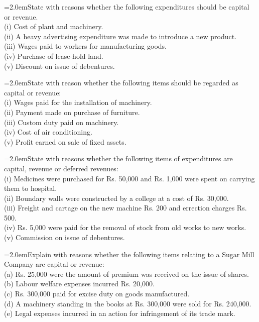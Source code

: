 \documentclass[11pt,a4paper]{article}
\newcommand{\lqn}[2]{\Needspace{6\baselineskip}\par\medskip\noindent\hangindent=2.0em\hangafter=1\makebox[2.0em][l]{\textbf{#1.}}#2\par}
\begin{document}
\lqn{126}{State with reasons whether the following expenditures should be capital or revenue.\\
(i) Cost of plant and machinery.\\
(ii) A heavy advertising expenditure was made to introduce a new product.\\
(iii) Wages paid to workers for manufacturing goods.\\
(iv) Purchase of lease-hold land.\\
(v) Discount on issue of debentures.\par
}
\lqn{127}{State with reason whether the following items should be regarded as capital or revenue:\\
(i) Wages paid for the installation of machinery.\\
(ii) Payment made on purchase of furniture.\\
(iii) Custom duty paid on machinery.\\
(iv) Cost of air conditioning.\\
(v) Profit earned on sale of fixed assets.\par
}
\lqn{128}{State with reasons whether the following items of expenditures are capital, revenue or deferred revenues:\\
(i) Medicines were purchased for Rs. 50,000 and Rs. 1,000 were spent on carrying them to hospital.\\
(ii) Boundary walls were constructed by a college at a cost of Rs. 30,000.\\
(iii) Freight and cartage on the new machine Rs. 200 and errection charges Rs. 500.\\
(iv) Rs. 5,000 were paid for the removal of stock from old works to new works.\\
(v) Commission on issue of debentures.\par
}
\lqn{129}{Explain with reasons whether the following items relating to a Sugar Mill Company are capital or revenue:\\
(a) Rs. 25,000 were the amount of premium was received on the issue of shares.\\
(b) Labour welfare expenses incurred Rs. 20,000.\\
(c) Rs. 300,000 paid for excise duty on goods manufactured.\\
(d) A machinery standing in the books at Rs. 300,000 were sold for Rs. 240,000.\\
(e) Legal expenses incurred in an action for infringement of its trade mark.\par
}
\end{document}
